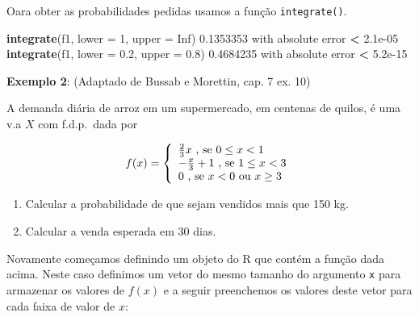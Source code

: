 \documentclass[10pt,a4paper]{book}
\newenvironment{Shaded}{\begin{snugshade}}{\end{snugshade}}
\newcommand{\KeywordTok}[1]{\textcolor[rgb]{0.13,0.29,0.53}{\textbf{#1}}}
\newcommand{\DataTypeTok}[1]{\textcolor[rgb]{0.13,0.29,0.53}{#1}}
\newcommand{\DecValTok}[1]{\textcolor[rgb]{0.00,0.00,0.81}{#1}}
\newcommand{\FloatTok}[1]{\textcolor[rgb]{0.00,0.00,0.81}{#1}}
\newcommand{\StringTok}[1]{\textcolor[rgb]{0.31,0.60,0.02}{#1}}
\newcommand{\OtherTok}[1]{\textcolor[rgb]{0.56,0.35,0.01}{#1}}
\newcommand{\OperatorTok}[1]{\textcolor[rgb]{0.81,0.36,0.00}{\textbf{#1}}}
\newcommand{\NormalTok}[1]{#1}
\providecommand{\tightlist}{%
  \setlength{\itemsep}{0pt}\setlength{\parskip}{0pt}}
\begin{document}
Oara obter as probabilidades pedidas usamos a função
\texttt{integrate()}.

\begin{Shaded}
\begin{Highlighting}[]
\KeywordTok{integrate}\NormalTok{(f1, }\DataTypeTok{lower =} \DecValTok{1}\NormalTok{, }\DataTypeTok{upper =} \OtherTok{Inf}\NormalTok{)}
\FloatTok{0.1353353}\NormalTok{ with absolute error }\OperatorTok{<}\StringTok{ }\FloatTok{2.1e-05}
\KeywordTok{integrate}\NormalTok{(f1, }\DataTypeTok{lower =} \FloatTok{0.2}\NormalTok{, }\DataTypeTok{upper =} \FloatTok{0.8}\NormalTok{)}
\FloatTok{0.4684235}\NormalTok{ with absolute error }\OperatorTok{<}\StringTok{ }\FloatTok{5.2e-15}
\end{Highlighting}
\end{Shaded}

\textbf{Exemplo 2}: (Adaptado de Bussab e Morettin, cap. 7 ex. 10)

A demanda diária de arroz em um supermercado, em centenas de quilos, é
uma v.a \(X\) com f.d.p.~dada por

\begin{eqnarray}
  f(x) = \left\{ \begin{array}{ll}
      \frac{2}{3}x \mbox{ , se $0 \leq x < 1$} \cr
      -\frac{x}{3} + 1 \mbox{ , se $ 1 \leq x < 3$} \cr
      0            \mbox{ , se $x < 0$  ou  $x \geq 3$}
    \end{array} \right.
\end{eqnarray}

\begin{enumerate}
\def\labelenumi{\alph{enumi}.}
\tightlist
\item
  Calcular a probabilidade de que sejam vendidos mais que 150 kg.
\item
  Calcular a venda esperada em 30 dias.
\end{enumerate}

Novamente começamos definindo um objeto do R que contém a função dada
acima. Neste caso definimos um vetor do mesmo tamanho do argumento
\texttt{x} para armazenar os valores de \(f(x)\) e a seguir preenchemos
os valores deste vetor para cada faixa de valor de \(x\):
\end{document}
